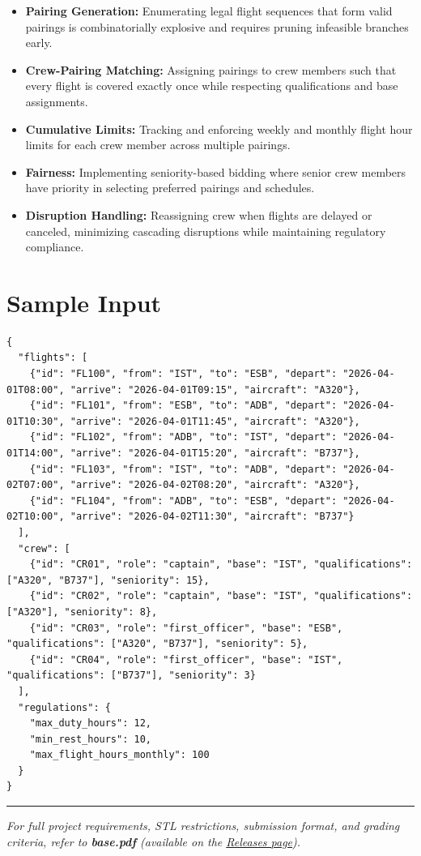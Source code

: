 \begin{itemize}
  \item \textbf{Pairing Generation:} Enumerating legal flight sequences that form valid pairings is combinatorially explosive and requires pruning infeasible branches early.
  \item \textbf{Crew-Pairing Matching:} Assigning pairings to crew members such that every flight is covered exactly once while respecting qualifications and base assignments.
  \item \textbf{Cumulative Limits:} Tracking and enforcing weekly and monthly flight hour limits for each crew member across multiple pairings.
  \item \textbf{Fairness:} Implementing seniority-based bidding where senior crew members have priority in selecting preferred pairings and schedules.
  \item \textbf{Disruption Handling:} Reassigning crew when flights are delayed or canceled, minimizing cascading disruptions while maintaining regulatory compliance.
\end{itemize}

\section{Sample Input}

\begin{lstlisting}[style=json, caption={data/input\_sample.json}]
{
  "flights": [
    {"id": "FL100", "from": "IST", "to": "ESB", "depart": "2026-04-01T08:00", "arrive": "2026-04-01T09:15", "aircraft": "A320"},
    {"id": "FL101", "from": "ESB", "to": "ADB", "depart": "2026-04-01T10:30", "arrive": "2026-04-01T11:45", "aircraft": "A320"},
    {"id": "FL102", "from": "ADB", "to": "IST", "depart": "2026-04-01T14:00", "arrive": "2026-04-01T15:20", "aircraft": "B737"},
    {"id": "FL103", "from": "IST", "to": "ADB", "depart": "2026-04-02T07:00", "arrive": "2026-04-02T08:20", "aircraft": "A320"},
    {"id": "FL104", "from": "ADB", "to": "ESB", "depart": "2026-04-02T10:00", "arrive": "2026-04-02T11:30", "aircraft": "B737"}
  ],
  "crew": [
    {"id": "CR01", "role": "captain", "base": "IST", "qualifications": ["A320", "B737"], "seniority": 15},
    {"id": "CR02", "role": "captain", "base": "IST", "qualifications": ["A320"], "seniority": 8},
    {"id": "CR03", "role": "first_officer", "base": "ESB", "qualifications": ["A320", "B737"], "seniority": 5},
    {"id": "CR04", "role": "first_officer", "base": "IST", "qualifications": ["B737"], "seniority": 3}
  ],
  "regulations": {
    "max_duty_hours": 12,
    "min_rest_hours": 10,
    "max_flight_hours_monthly": 100
  }
}
\end{lstlisting}

\vfill
\noindent\rule{\textwidth}{0.4pt}
{\small\textit{For full project requirements, STL restrictions, submission format, and grading criteria, refer to \textbf{base.pdf} (available on the \href{https://github.com/BestSithInEU/cse211-term-projects/releases}{Releases page}).}}
